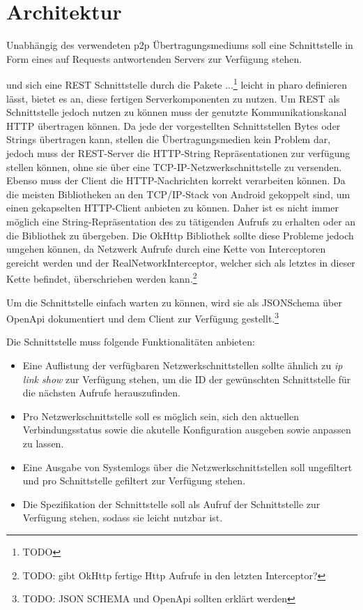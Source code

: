 \section{Architektur}
    Unabhängig des verwendeten p2p Übertragungsmediums soll eine Schnittstelle in Form eines auf Requests antwortenden Servers zur Verfügung stehen.

    und sich eine REST Schnittstelle durch die Pakete ...\footnote{TODO} leicht in pharo definieren lässt, bietet es an, diese fertigen Serverkomponenten zu nutzen.
    Um REST als Schnittstelle jedoch nutzen zu können muss der genutzte Kommunikationskanal HTTP übertragen können. Da jede der vorgestellten Schnittstellen Bytes oder Strings
    übertragen kann, stellen die Übertragungsmedien kein Problem dar, jedoch muss der REST-Server die HTTP-String Repräsentationen zur verfügung stellen können,
    ohne sie über eine TCP-IP-Netzwerkschnittstelle zu versenden. Ebenso muss der Client die HTTP-Nachrichten korrekt verarbeiten können.
    Da die meisten Bibliotheken an den TCP/IP-Stack von Android gekoppelt sind, um einen gekapselten HTTP-Client anbieten zu können.
    Daher ist es nicht immer möglich eine String-Repräsentation des zu tätigenden Aufrufs zu erhalten oder an die Bibliothek zu übergeben.
    Die OkHttp Bibliothek sollte diese Probleme jedoch umgehen können, da Netzwerk Aufrufe durch eine Kette von Interceptoren gereicht werden und der RealNetworkInterceptor,
    welcher sich als letztes in dieser Kette befindet, überschrieben werden kann.\footnote{TODO: gibt OkHttp fertige Http Aufrufe in den letzten Interceptor?}

    Um die Schnittstelle einfach warten zu können, wird sie als JSONSchema über OpenApi dokumentiert und dem Client zur Verfügung gestellt.\footnote{TODO: JSON SCHEMA und OpenApi sollten erklärt werden}

    Die Schnittstelle muss folgende Funktionalitäten anbieten:
    \begin{itemize}
        \item Eine Auflistung der verfügbaren Netzwerkschnittstellen sollte ähnlich zu {\it ip link show} zur Verfügung stehen, um die ID der gewünschten Schnittstelle für die nächsten Aufrufe herauszufinden.
        \item Pro Netzwerkschnittstelle soll es möglich sein, sich den aktuellen Verbindungsstatus sowie die akutelle Konfiguration ausgeben sowie anpassen zu lassen.
        \item Eine Ausgabe von Systemlogs über die Netzwerkschnittstellen soll ungefiltert und pro Schnittstelle gefiltert zur Verfügung stehen.
        \item Die Spezifikation der Schnittstelle soll als Aufruf der Schnittstelle zur Verfügung stehen, sodass sie leicht nutzbar ist.
    \end{itemize}

